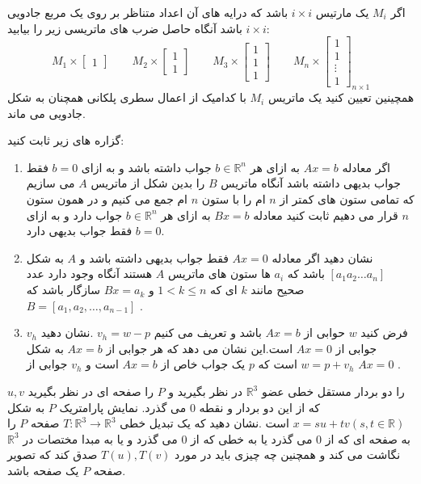 \documentclass{article}
\begin{document}
اگر 
$M_i$
یک مارتیس 
$i\times i$
باشد که درایه های آن اعداد متناظر بر روی یک مربع جادویی 
$i\times i$
باشد آنگاه حاصل ضرب های ماتریسی زیر را بیابید:
$$M_1 \times
\begin{bmatrix}
1
\end{bmatrix}
\qquad M_2 \times
\begin{bmatrix}
1\\
1
\end{bmatrix}
\qquad M_3 \times
\begin{bmatrix}
1\\
1\\
1
\end{bmatrix}
\qquad M_n \times
\begin{bmatrix}
	1\\
	1\\
	\vdots\\
	1
\end{bmatrix}_{n\times1}
$$
همچینین تعیین کنید یک ماتریس 
$M_i$
با کدامیک از اعمال سطری پلکانی همچنان به شکل جادویی می ماند.


گزاره های زیر ثابت کنید:
\begin{enumerate}
\item 
	اگر معادله 
	$Ax=b$
	به ازای هر 
	$b\in \mathbb{R}^n$
	جواب داشته باشد و به ازای 
	$b=0$
	فقط جواب بدیهی داشته باشد آنگاه  ماتریس 
	$B$
	 را بدین شکل از ماتریس 
	 $A$ 
	 می سازیم که تمامی ستون های کمتر از 
	 $n$ 
	ام را با ستون 
	 $n$
	 ام جمع می کنیم و در همون ستون 
	 $n $
	 قرار می دهیم ثابت کنید معادله 
	 $Bx=b$
	 به ازای هر 
	 $b\in \mathbb{R}^n$
	 جواب دارد و به ازای 
	 $b=0$
	 فقط جواب بدیهی دارد.
	 \item 
	 نشان دهید اگر معادله 
	 $Ax=0$
	 فقط جواب بدیهی داشته باشد و 
	 $A$
	 به شکل 
	 $[a_1 a_2 \ldots a_n]$
	باشد که 
	 $a_i$
	 ها ستون های ماتریس 
	 $A$
	 هستند آنگاه وجود دارد عدد صحیح مانند 
	 $k$
	 ای که 
	 $1<k\le n$
	 و 
	 $Bx=a_k$
	 سازگار باشد
	 که 
	 $B=[a_1,a_2,\ldots,a_{n-1}]$
	 .
	 \item 
	 فرض کنید 
	 $w$
	حوابی از 
	$Ax=b$ 
	باشد و تعریف می کنیم 
	$v_h=w-p$
	.نشان دهید 
	$v_h$
	جوابی از 
	$Ax=0$
	است.این نشان می دهد که هر جوابی از 
	$Ax=b$
	به شکل 
	$w=p+v_h$
	است که 
	$p$
	یک جواب خاص از 
	$Ax=b$
	 است و 
	 $v_h$
	 جوابی از
	 $Ax=0$
	 .
	 
\end{enumerate}

$u,v$
 را دو بردار مستقل خطی عضو 
 $\mathbb{R}^3$
 در نظر بگیرید و 
 $P$
 را  صفحه ای در نظر بگیرید که از این دو بردار و نقطه 
 $0$
 می گذرد. نمایش پارامتریک 
 $P$
 به شکل 
 $x=su+tv(s,t \in \mathbb{R})$
 است .نشان دهید که یک تبدیل خطی 
 $T:\mathbb{R}^3\longrightarrow \mathbb{R}^3$
 صفحه 
 $P$
 را به صفحه ای که از 
 $0$
 می گذرد یا به خطی که از 
 $0$
 می گذرد و یا به مبدا مختصات در 
 $\mathbb{R}^3$
 نگاشت می کند و همچنین چه چیزی باید در مورد 
 $T(u),T(v)$
 صدق کند که تصویر صفحه 
 $P$
 یک صفحه باشد.
 
\end{document}
